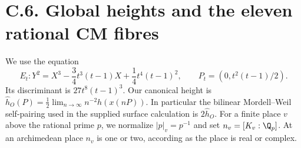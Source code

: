 \section{C.6. Global heights and the eleven rational CM fibres}

We use the equation
\[
 E_t:Y^2=X^3-\frac34t^3(t-1)X+\frac14t^4(t-1)^2,
 \qquad P_t=(0,t^2(t-1)/2).
\]
Its discriminant is $27t^8(t-1)^3$. Our canonical height is
$\widehat h_O(P)=\frac12\lim_{n\to\infty}n^{-2}h(x(nP))$.
In particular the bilinear Mordell--Weil self-pairing used in the
supplied surface calculation is $2\widehat h_O$.
For a finite place $v$ above the rational prime $p$, we normalize
$|p|_v=p^{-1}$ and set $n_v=[K_v:\Q_p]$. At an archimedean
place $n_v$ is one or two, according as the place is real or complex.

